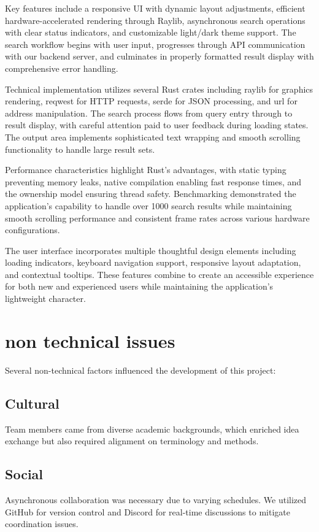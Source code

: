 \documentclass[twoside]{article}
\begin{document}
Key features include a responsive UI with dynamic layout adjustments, efficient hardware-accelerated rendering through Raylib, asynchronous search operations with clear status indicators, and customizable light/dark theme support. The search workflow begins with user input, progresses through API communication with our backend server, and culminates in properly formatted result display with comprehensive error handling.

Technical implementation utilizes several Rust crates including raylib for graphics rendering, reqwest for HTTP requests, serde for JSON processing, and url for address manipulation. The search process flows from query entry through to result display, with careful attention paid to user feedback during loading states. The output area implements sophisticated text wrapping and smooth scrolling functionality to handle large result sets.

Performance characteristics highlight Rust's advantages, with static typing preventing memory leaks, native compilation enabling fast response times, and the ownership model ensuring thread safety. Benchmarking demonstrated the application's capability to handle over 1000 search results while maintaining smooth scrolling performance and consistent frame rates across various hardware configurations.

The user interface incorporates multiple thoughtful design elements including loading indicators, keyboard navigation support, responsive layout adaptation, and contextual tooltips. These features combine to create an accessible experience for both new and experienced users while maintaining the application's lightweight character.


\section{non technical issues}
Several non-technical factors influenced the development of this project:

\subsection{Cultural}
Team members came from diverse academic backgrounds, which enriched idea exchange but also required alignment on terminology and methods.

\subsection{Social}
Asynchronous collaboration was necessary due to varying schedules. We utilized GitHub for version control and Discord for real-time discussions to mitigate coordination issues.
\end{document}
